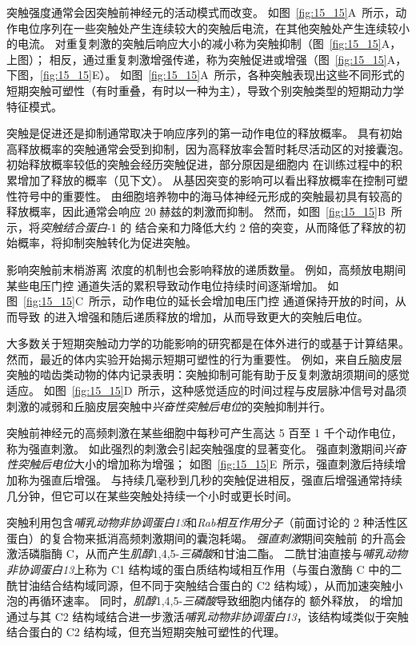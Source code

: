 突触强度通常会因突触前神经元的活动模式而改变。
如图~\ref{fig:15_15}A~所示，动作电位序列在一些突触处产生连续较大的突触后电流，在其他突触处产生连续较小的电流。
对重复刺激的突触后响应大小的减小称为突触抑制（图~\ref{fig:15_15}A，上图）；
相反，通过重复刺激增强传递，称为突触促进或增强（图~\ref{fig:15_15}A，下图，\ref{fig:15_15}E）。
如图~\ref{fig:15_15}A~所示，各种突触表现出这些不同形式的短期突触可塑性（有时重叠，有时以一种为主），导致个别突触类型的短期动力学特征模式。


突触是促进还是抑制通常取决于响应序列的第一动作电位的释放概率。
具有初始高释放概率的突触通常会受到抑制，因为高释放率会暂时耗尽活动区的对接囊泡。
初始释放概率较低的突触会经历突触促进，部分原因是细胞内  在训练过程中的积累增加了释放的概率（见下文）。
从基因突变的影响可以看出释放概率在控制可塑性符号中的重要性。
由细胞培养物中的海马体神经元形成的突触最初具有较高的释放概率，因此通常会响应 20 赫兹的刺激而抑制。
然而，如图~\ref{fig:15_15}B~所示，将\textit{突触结合蛋白}-1 的  结合亲和力降低大约 2 倍的突变，从而降低了释放的初始概率，将抑制突触转化为促进突触。


影响突触前末梢游离  浓度的机制也会影响释放的递质数量。
例如，高频放电期间某些电压门控  通道失活的累积导致动作电位持续时间逐渐增加。
如图~\ref{fig:15_15}C~所示，动作电位的延长会增加电压门控  通道保持开放的时间，从而导致  的进入增强和随后递质释放的增加，从而导致更大的突触后电位。


大多数关于短期突触动力学的功能影响的研究都是在体外进行的或基于计算结果。
然而，最近的体内实验开始揭示短期可塑性的行为重要性。
例如，来自丘脑皮层突触的啮齿类动物的体内记录表明：突触抑制可能有助于反复刺激胡须期间的感觉适应。
如图~\ref{fig:15_15}D~所示，这种感觉适应的时间过程与皮层脉冲信号对晶须刺激的减弱和丘脑皮层突触中\textit{兴奋性突触后电位}的突触抑制并行。


突触前神经元的高频刺激在某些细胞中每秒可产生高达 5 百至 1 千个动作电位，称为强直刺激。
如此强烈的刺激会引起突触强度的显著变化。
强直刺激期间\textit{兴奋性突触后电位}大小的增加称为增强；
如图~\ref{fig:15_15}E~所示，强直刺激后持续增加称为强直后增强。
与持续几毫秒到几秒的突触促进相反，强直后增强通常持续几分钟，但它可以在某些突触处持续一个小时或更长时间。


突触利用包含\textit{哺乳动物非协调蛋白13}和\textit{Rab相互作用分子}（前面讨论的 2 种活性区蛋白）的复合物来抵消高频刺激期间的囊泡耗竭。
\textit{强直刺激}期间突触前  的升高会激活磷脂酶 C，从而产生\textit{肌醇}1,4,5-\textit{三磷酸}和甘油二酯。
二酰甘油直接与\textit{哺乳动物非协调蛋白13}上称为 C1 结构域的蛋白质结构域相互作用（与蛋白激酶 C 中的二酰甘油结合结构域同源，但不同于突触结合蛋白的 C2 结构域），从而加速突触小泡的再循环速率。
同时，\textit{肌醇}1,4,5-\textit{三磷酸}导致细胞内储存的  额外释放， 的增加通过与其 C2 结构域结合进一步激活\textit{哺乳动物非协调蛋白13}，该结构域类似于突触结合蛋白的 C2 结构域，但充当短期突触可塑性的代理。



